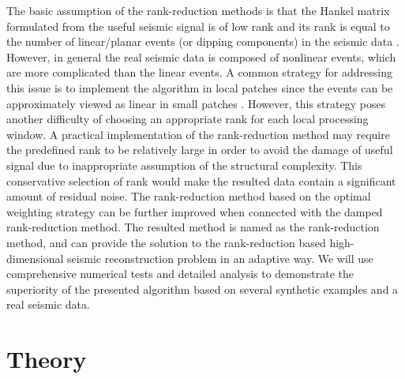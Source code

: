 The basic assumption of the rank-reduction methods is that the Hankel matrix formulated from the useful seismic signal is of low rank and its rank is equal to the number of linear/planar events (or dipping components) in the seismic data \cite[]{mssa,weilin2016,amir2017grsl,yangkang2017lsrtm,yatong2018inter,wujuan2018jge1,wujuan2018jse1,wujuan2018jge3,baimin2018jse1,baimin2018cg,baimin2019jag,wujuan2019jse1}. However, in general the real seismic data is composed of nonlinear events, which are more complicated than the linear events. A common strategy for addressing this issue is to implement the algorithm in local patches since the events can be approximately viewed as linear in small patches \cite[]{zhangdong2017}. However, this strategy poses another difficulty of choosing an appropriate rank for each local processing window.  A practical implementation of the rank-reduction method may require the predefined rank to be relatively large in order to avoid the damage of useful signal due to inappropriate assumption of the structural complexity. This conservative selection of rank would make the resulted data contain a significant amount of residual noise.  The rank-reduction method based on the optimal weighting strategy can be further improved when connected with the damped rank-reduction method. The resulted method is named as the  rank-reduction method, and can  provide the  solution to the rank-reduction based high-dimensional seismic reconstruction problem in an adaptive way. We will use comprehensive numerical tests and detailed analysis to demonstrate the superiority of the presented algorithm based on several synthetic examples and a real seismic data.


\section{Theory}
